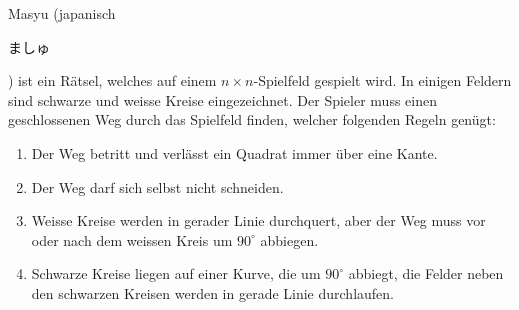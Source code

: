 Masyu (japanisch \begin{CJK}{UTF8}{min}ましゅ\end{CJK})
ist ein Rätsel, welches auf einem $n\times n$-Spielfeld 
gespielt wird.
In einigen Feldern sind schwarze und weisse Kreise eingezeichnet.
Der Spieler muss einen geschlossenen Weg durch das Spielfeld
finden, welcher folgenden Regeln genügt:
\begin{enumerate}
\item 
Der Weg betritt und verlässt ein Quadrat immer über eine Kante.
\item 
Der Weg darf sich selbst nicht schneiden.
\item 
Weisse Kreise werden in gerader Linie durchquert, aber der Weg muss
vor oder nach dem weissen Kreis um $90^\circ$ abbiegen.
\item 
Schwarze Kreise liegen auf einer Kurve, die um $90^\circ$ abbiegt,
die Felder neben den schwarzen Kreisen werden in gerade Linie 
durchlaufen.
\end{enumerate}

